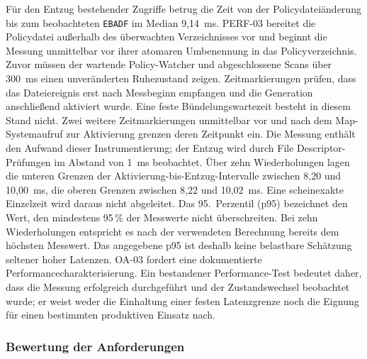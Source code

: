 Für den Entzug bestehender Zugriffe betrug die Zeit von der Policydateiänderung bis zum
beobachteten \texttt{EBADF} im Median 9,14~ms. PERF-03 bereitet die Policydatei außerhalb
des überwachten Verzeichnisses vor und beginnt die Messung unmittelbar vor ihrer atomaren
Umbenennung in das Policyverzeichnis. Zuvor müssen der wartende Policy-Watcher und abgeschlossene
Scans über 300~ms einen unveränderten Ruhezustand zeigen. Zeitmarkierungen prüfen, dass das
Dateiereignis erst nach Messbeginn empfangen und die Generation anschließend aktiviert wurde.
Eine feste Bündelungswartezeit besteht in diesem Stand nicht. Zwei weitere Zeitmarkierungen unmittelbar vor und nach dem Map-Systemaufruf
zur Aktivierung grenzen deren Zeitpunkt ein. Die Messung enthält den Aufwand dieser
Instrumentierung; der Entzug wird durch File Descriptor-Prüfungen im Abstand von 1~ms beobachtet.
Über zehn Wiederholungen lagen die unteren Grenzen der Aktivierung-bis-Entzug-Intervalle
zwischen 8,20 und 10,00~ms, die oberen Grenzen zwischen 8,22 und 10,02~ms. Eine scheinexakte
Einzelzeit wird daraus nicht abgeleitet. Das 95.~Perzentil (p95) bezeichnet
den Wert, den mindestens 95\,\% der Messwerte nicht überschreiten.
Bei zehn Wiederholungen entspricht es nach der verwendeten Berechnung
bereits dem höchsten Messwert. Das angegebene p95 ist deshalb keine
belastbare Schätzung seltener hoher Latenzen. OA-03 fordert eine dokumentierte
Performancecharakterisierung. Ein bestandener Performance-Test bedeutet daher, dass die
Messung erfolgreich durchgeführt und der Zustandswechsel beobachtet wurde; er weist weder
die Einhaltung einer festen Latenzgrenze noch die Eignung für einen bestimmten produktiven Einsatz nach.

\subsubsection{Bewertung der Anforderungen}

